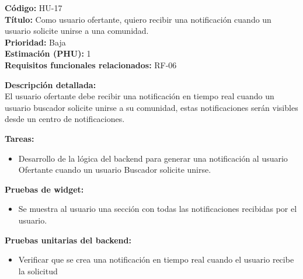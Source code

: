 \begin{tarjetaHU}
\textbf{Código:} HU-17 \\
\textbf{Título:} Como usuario ofertante, quiero recibir una notificación cuando un usuario solicite unirse a una comunidad. \\
\textbf{Prioridad:} Baja \\
\textbf{Estimación (PHU):} 1 \\
\textbf{Requisitos funcionales relacionados:} RF-06

\vspace{0.5em}
\textbf{Descripción detallada:} \\
El usuario ofertante debe recibir una notificación en tiempo real cuando un usuario buscador solicite unirse a su comunidad, estas notificaciones serán visibles desde un centro de notificaciones.

\vspace{0.5em}
\textbf{Tareas:}
\begin{itemize}[left=0pt]
  \item Desarrollo de la lógica del backend para generar una notificación al usuario Ofertante cuando un usuario Buscador solicite unirse.
\end{itemize}

\vspace{0.5em}
\textbf{Pruebas de widget:}
\begin{itemize}[left=0pt]
  \item Se muestra al usuario una sección con todas las notificaciones recibidas por el usuario.
\end{itemize}
\textbf{Pruebas unitarias del backend:}
\begin{itemize}[left=0pt]
  \item Verificar que se crea una notificación en tiempo real cuando el usuario recibe la solicitud
\end{itemize}
\end{tarjetaHU}

